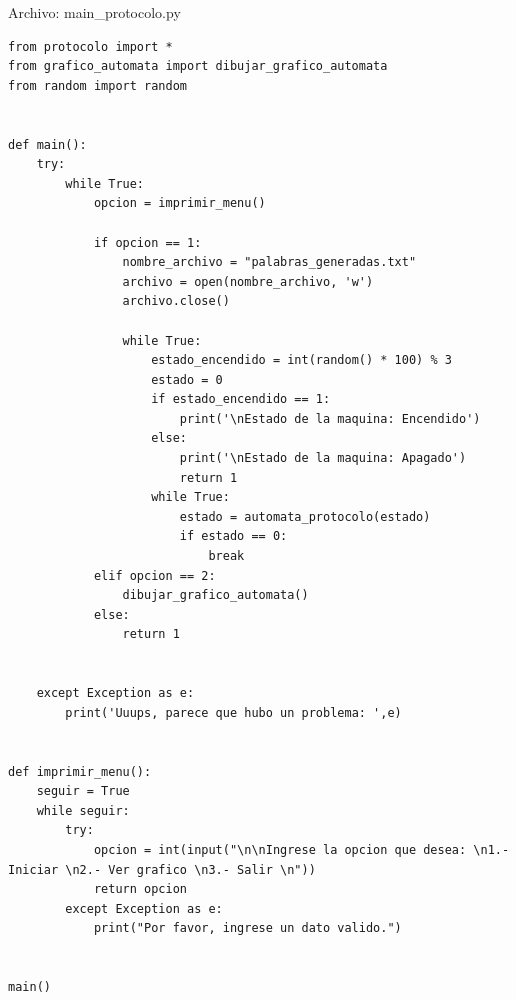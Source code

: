 \documentclass[12pt]{article}
\begin{document}
Archivo: main\_protocolo.py
\lstset{language=Python, breaklines=true, basicstyle=\footnotesize}
\begin{lstlisting}[frame=single]
from protocolo import *
from grafico_automata import dibujar_grafico_automata
from random import random


def main():
    try:
        while True:
            opcion = imprimir_menu()

            if opcion == 1:
                nombre_archivo = "palabras_generadas.txt"
                archivo = open(nombre_archivo, 'w')
                archivo.close()

                while True:
                    estado_encendido = int(random() * 100) % 3
                    estado = 0
                    if estado_encendido == 1:
                        print('\nEstado de la maquina: Encendido')
                    else:
                        print('\nEstado de la maquina: Apagado')
                        return 1
                    while True:
                        estado = automata_protocolo(estado)
                        if estado == 0:
                            break
            elif opcion == 2:
                dibujar_grafico_automata()
            else:
                return 1


    except Exception as e:
        print('Uuups, parece que hubo un problema: ',e)


def imprimir_menu():
    seguir = True
    while seguir:
        try:
            opcion = int(input("\n\nIngrese la opcion que desea: \n1.- Iniciar \n2.- Ver grafico \n3.- Salir \n"))
            return opcion
        except Exception as e:
            print("Por favor, ingrese un dato valido.")


main()

\end{lstlisting}

\vspace{1em}
\end{document}
